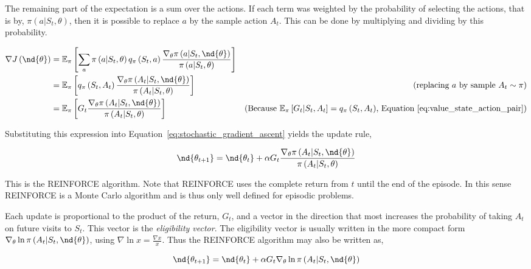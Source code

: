 The remaining part of the expectation is a sum over the actions. If each term was weighted by the probability of selecting the actions, that is by, $\pi\left(a|S_t,\theta\right)$, then it is possible to replace $a$ by the sample action $A_t$. This can be done by multiplying and dividing by this probability.

\begin{align}
  \nabla J\left(\nd{\theta}\right)&= \mathbb{E}_\pi\left[\sum_a \pi\left(a|S_t,\theta\right)q_\pi\left(S_t, a\right) \frac{\nabla_\theta \pi\left(a|S_t, \nd{\theta}\right)}{\pi\left(a|S_t,\theta\right)}\right]\\
  &=\mathbb{E}_\pi\left[q_\pi\left(S_t, A_t\right) \frac{\nabla_\theta \pi\left(A_t|S_t, \nd{\theta}\right)}{\pi\left(A_t|S_t,\theta\right)}\right]&\text{(replacing $a$ by sample $A_t \sim \pi$)}\\
  &=\mathbb{E}_\pi\left[G_t \frac{\nabla_\theta \pi\left(A_t|S_t, \nd{\theta}\right)}{\pi\left(A_t|S_t,\theta\right)}\right]&\text{(Because $\mathbb{E}_\pi\left[G_t|S_t, A_t\right]=q_\pi\left(S_t, A_t\right)$, Equation~\ref{eq:value_state_action_pair})}
\end{align}

Substituting this expression into Equation~\ref{eq:stochastic_gradient_ascent} yields the update rule,

\begin{equation}
  \nd{\theta_{t+1}} = \nd{\theta_t} + \alpha G_t \frac{\nabla_\theta \pi\left(A_t|S_t, \nd{\theta}\right)}{\pi\left(A_t|S_t,\theta\right)}
  \label{eq:reinforce_1}
\end{equation}

This is the REINFORCE algorithm. Note that REINFORCE uses the complete return from $t$ until the end of the episode. In this sense REINFORCE is a Monte Carlo algorithm and is thus only well defined for episodic problems.

Each update is proportional to the product of the return, $G_t$, and a vector in the direction that most increases the probability of taking $A_t$ on future visits to $S_t$. This vector is the \emph{eligibility vector}. The eligibility vector is usually written in the more compact form $\nabla_\theta \ln \pi\left(A_t|S_t, \nd{\theta}\right)$, using $\nabla \ln x=\frac{\nabla x}{x}$. Thus the REINFORCE algorithm may also be written as,

\begin{equation}
  \nd{\theta_{t+1}} = \nd{\theta_t} + \alpha G_t \nabla_\theta \ln \pi\left(A_t|S_t, \nd{\theta}\right)
  \label{eq:reinforce_2}
\end{equation}

